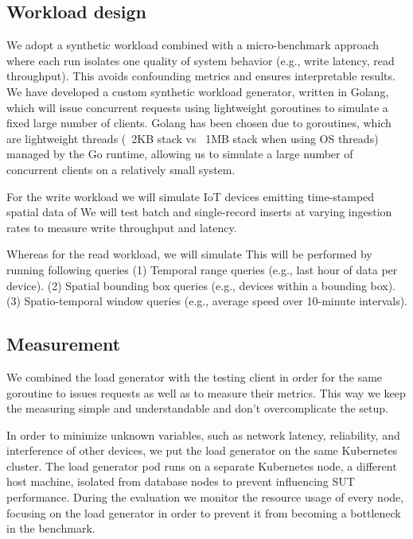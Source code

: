 \subsection{Workload design}
We adopt a synthetic workload combined with a micro-benchmark approach where each run isolates one quality of system behavior (e.g., write latency, read throughput).
This avoids confounding metrics and ensures interpretable results.
We have developed a custom synthetic workload generator, written in Golang, which will issue concurrent requests using lightweight goroutines to simulate a fixed large number of clients.
Golang has been chosen due to goroutines, which are lightweight threads (~2KB stack vs ~1MB stack when using OS threads) managed by the Go runtime, allowing us to simulate a large number of concurrent clients on a relatively small system.

For the write workload we will simulate IoT devices emitting time-stamped spatial data of %
We will test batch and single-record inserts at varying ingestion rates to measure write throughput and latency.

Whereas for the read workload, we will simulate %
This will be performed by running following queries
(1) Temporal range queries (e.g., last hour of data per device).
(2) Spatial bounding box queries (e.g., devices within a bounding box).
(3) Spatio-temporal window queries (e.g., average speed over 10-minute intervals).

\subsection{Measurement}
We combined the load generator with the testing client in order for the same goroutine to issues requests as well as to measure their metrics.
This way we keep the measuring simple and understandable and don't overcomplicate the setup.

In order to minimize unknown variables, such as network latency, reliability, and interference of other devices, we put the load generator on the same Kubernetes cluster.
The load generator pod runs on a separate Kubernetes node, a different host machine, isolated from database nodes to prevent influencing SUT performance.
During the evaluation we monitor the resource usage of every node, focusing on the load generator in order to prevent it from becoming a bottleneck in the benchmark.
